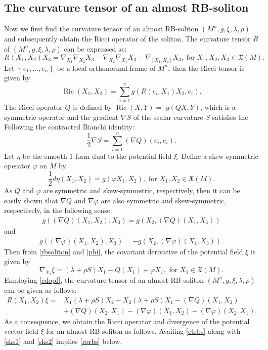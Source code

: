 \documentclass[a4paper, twoside, 10pt]{article}
\numberwithin{equation}{section}
\theoremstyle{definition}
\begin{document}
\subsection{The curvature tensor of an almost RB-soliton}\label{cur}
Now we first find the curvature tensor of an almost RB-soliton $(M^n, g, \xi, \lambda,\rho)$ and subsequently obtain the Ricci operator
of the soliton. The curvature tensor $R$ of $(M^n, g, \xi, \lambda,\rho)$ can be expressed as:
$$R(X_1, X_2) X_3=\nabla_{X_1} \nabla_{X_2} X_3-\nabla_{X_2} \nabla_{X_1} X_3-\nabla_{[X_1, X_2]} X_3, \; \mbox{for} \; X_1, X_2, X_3 \in \mathfrak{X}(M).$$
Let $\left\{e_{1}, \ldots, e_{n}\right\}$ be a local orthonormal frame  of $M^n$,  then the Ricci tensor is given by
$$
\operatorname{Ric}(X_1, X_2)=\sum_{i=1}^{n} g\left(R\left(e_{i}, X_1\right) X_2, e_{i}\right).$$
The Ricci operator $Q$ is defined by $\operatorname{Ric}(X, Y)=$ $g(Q X, Y)$, which is a symmetric operator and the gradient $\nabla S$ of the scalar curvature $S$ satisfies the
Following the contracted Bianchi identity:
\begin{equation}\label{csbi}
    \frac{1}{2} \nabla S=\sum_{i=1}^{n}(\nabla Q)\left(e_{i}, e_{i}\right).
\end{equation}
Let $\eta$ be the smooth $1$-form dual to the potential field $\xi$. Define a skew-symmetric operator $\varphi$ on $M$ by
\begin{equation}\label{phi}
    \frac{1}{2} d \eta(X_1, X_2)=g(\varphi X_1, X_2), \mbox{ for } X_1, X_2 \in \mathfrak{X}(M) .
\end{equation}
As $Q$ and $\varphi$ are symmetric and skew-symmetric, respectively, then it can be easily
shown that $\nabla Q$ and $\nabla \varphi$ 
are also symmetric and skew-symmetric, respectively, in the following sense:
\begin{eqnarray}\label{sks1}
g((\nabla Q)(X_1,X_2),X_3)=g(X_2,(\nabla Q)(X_1,X_3))
\end{eqnarray}
\mbox{and}    
\begin{eqnarray}\label{sks2}
g((\nabla \varphi)(X_1,X_2),X_3)=-g(X_2,(\nabla\varphi )(X_1,X_3)).
\end{eqnarray}
Then from  \eqref{rbsoliton} and \eqref{phi}, the covariant derivative of the potential field $\xi$ is given by
\begin{equation}\label{cdopf}
    \nabla_{X_1} \xi=(\lambda +\rho S) X_1-Q(X_1)+\varphi X_1, \mbox{ for } X_1 \in \mathfrak{X}(M).
\end{equation}
Employing \eqref{cdopf}, the curvature tensor of an  almost RB-soliton $(M^n,g,\xi,\lambda,\rho)$
can be given as follows:
\begin{eqnarray} \label{ctrbs}
    R(X_1,X_2)\xi= &X_1(\lambda+\rho S)X_2- X_2(\lambda+\rho S)X_1-(\nabla Q)(X_1,X_2)\\ \nonumber
             & +(\nabla Q)(X_2,X_1)-(\nabla \varphi)(X_1,X_2)-(\nabla \varphi)(X_2,X_1).
\end{eqnarray}
As a consequence, we obtain the Ricci operator and divergence of the potential vector field $\xi$  for 
an almost RB-soliton as follows.
Availing \eqref{ctrbs} along with \eqref{sks1} and \eqref{sks2} implies \eqref{rorbs} below.
\end{document}
